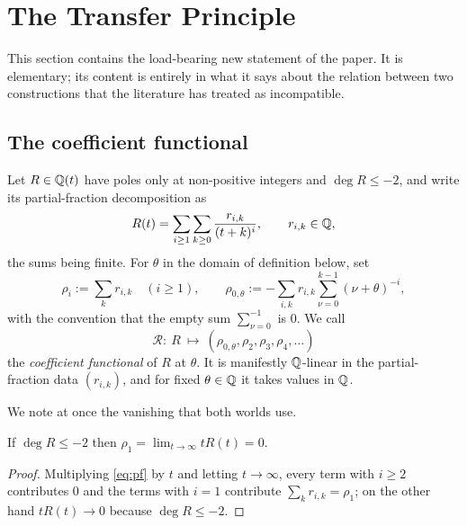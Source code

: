 \section{The Transfer Principle}\label{sec:transfer}

This section contains the load-bearing new statement of the paper. It is elementary; its
content is entirely in what it says about the relation between two constructions that the
literature has treated as incompatible.

\subsection{The coefficient functional}\label{ss:coeff}

\begin{definition}\label{def:rho}
Let $R\in\mathbb{Q}(t)$ have poles only at non-positive integers and $\deg R\le-2$, and write its
partial-fraction decomposition as
\begin{equation}\label{eq:pf}
 R(t)=\sum_{i\ge1}\sum_{k\ge0}\frac{r_{i,k}}{(t+k)^i},\qquad r_{i,k}\in\mathbb{Q},
\end{equation}
the sums being finite. For $\theta$ in the domain of definition below, set
\begin{equation}\label{eq:rhodef}
 \rho_i:=\sum_k r_{i,k}\quad(i\ge1),
 \qquad
 \rho_{0,\theta}:=-\sum_{i,k}r_{i,k}\sum_{\nu=0}^{k-1}(\nu+\theta)^{-i},
\end{equation}
with the convention that the empty sum $\sum_{\nu=0}^{-1}$ is $0$. We call
\begin{equation}\label{eq:functional}
 \mathcal R:\ R\ \longmapsto\ (\rho_{0,\theta},\rho_2,\rho_3,\rho_4,\dots)
\end{equation}
the \emph{coefficient functional} of $R$ at $\theta$. It is manifestly $\mathbb{Q}$-linear in the
partial-fraction data $(r_{i,k})$, and for fixed $\theta\in\mathbb{Q}$ it takes values in $\mathbb{Q}$.
\end{definition}

We note at once the vanishing that both worlds use.

\begin{lemma}\label{lem:rho1}
\PROVED{} If $\deg R\le-2$ then $\rho_1=\lim_{t\to\infty}tR(t)=0$.
\end{lemma}

\begin{proof}
Multiplying \eqref{eq:pf} by $t$ and letting $t\to\infty$, every term with $i\ge2$
contributes $0$ and the terms with $i=1$ contribute $\sum_kr_{i,k}=\rho_1$; on the other
hand $tR(t)\to0$ because $\deg R\le-2$.
\end{proof}


